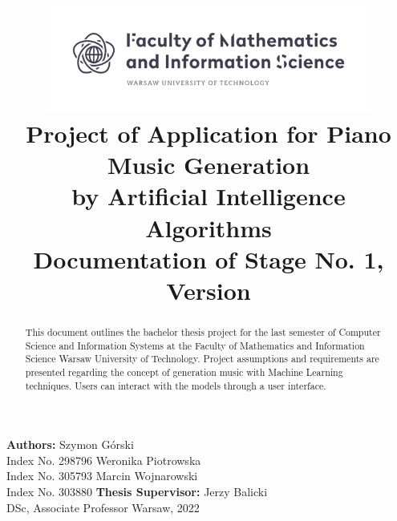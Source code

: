 \documentclass{article}
\title{\includegraphics[width=0.8\textwidth]{MINI.png} \\ Project of Application for Piano Music Generation \\ by Artificial Intelligence Algorithms \\ [0.35em]\large Documentation of Stage No. 1, \\ Version \currentversion }
\author{}
\date{}
\begin{document}
\maketitle
\begin{center}
    \normalsize\textbf{Authors:}
    \vskip10pt
    \Large{Szymon Górski} \\
    \large{Index No. 298796}
    \vskip10pt
    \Large{Weronika Piotrowska} \\
    \large{Index No. 305793}
    \vskip10pt
    \Large{Marcin Wojnarowski} \\
    \large{Index No. 303880}
    \vskip50pt
    \normalsize\textbf{Thesis Supervisor:}
    \vskip10pt
    \Large{Jerzy Balicki} \\
    \large{DSc, Associate Professor}
    \vfill
    \large{Warsaw, 2022}
\end{center}

\newpage
\begin{abstract}
    This document outlines the bachelor thesis project for the last semester of Computer Science and Information Systems at the Faculty of Mathematics and Information Science Warsaw University of Technology. Project assumptions and requirements are presented regarding the concept of generation music with Machine Learning techniques. Users can interact with the models through a user interface.
\end{abstract}

\vskip50pt
\end{document}
